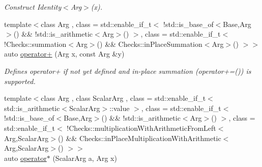 \begin{DoxyCompactItemize}
\begin{DoxyCompactList}\small\item\em Construct Identity$<$\-Arg$>$(x). \end{DoxyCompactList}\item 
\hypertarget{namespaceFunG_a063d3e8c19dbea3ee1396736fecb64e1}{{\footnotesize template$<$class Arg , class  = std\-::enable\-\_\-if\-\_\-t$<$ !std\-::is\-\_\-base\-\_\-of$<$\-Base,\-Arg$>$() \&\& !std\-::is\-\_\-arithmetic$<$\-Arg$>$() $>$, class  = std\-::enable\-\_\-if\-\_\-t$<$ !\-Checks\-::summation$<$\-Arg$>$() \&\&                                       Checks\-::in\-Place\-Summation$<$\-Arg$>$() $>$$>$ }\\auto \hyperlink{namespaceFunG_a063d3e8c19dbea3ee1396736fecb64e1}{operator+} (Arg x, const Arg \&y)}\label{namespaceFunG_a063d3e8c19dbea3ee1396736fecb64e1}

\begin{DoxyCompactList}\small\item\em Defines operator+ if not yet defined and in-\/place summation (operator+=()) is supported. \end{DoxyCompactList}\item 
\hypertarget{namespaceFunG_a9b303ce8718a6f64b035e7e782370734}{{\footnotesize template$<$class Arg , class Scalar\-Arg , class  = std\-::enable\-\_\-if\-\_\-t$<$ std\-::is\-\_\-arithmetic$<$\-Scalar\-Arg$>$\-::value $>$, class  = std\-::enable\-\_\-if\-\_\-t$<$ !std\-::is\-\_\-base\-\_\-of$<$\-Base,\-Arg$>$() \&\& !std\-::is\-\_\-arithmetic$<$\-Arg$>$() $>$, class  = std\-::enable\-\_\-if\-\_\-t$<$ !\-Checks\-::multiplication\-With\-Arithmetic\-From\-Left$<$\-Arg,\-Scalar\-Arg$>$() \&\&                                       Checks\-::in\-Place\-Multiplication\-With\-Arithmetic$<$\-Arg,\-Scalar\-Arg$>$() $>$$>$ }\\auto \hyperlink{namespaceFunG_a9b303ce8718a6f64b035e7e782370734}{operator$\ast$} (Scalar\-Arg a, Arg x)}\label{namespaceFunG_a9b303ce8718a6f64b035e7e782370734}


\end{DoxyCompactItemize}
